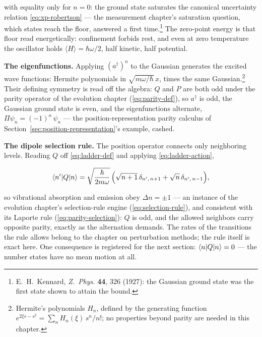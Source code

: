 with equality only for $n = 0$: the ground state saturates the canonical uncertainty relation \eqref{eq:xp-robertson} --- the measurement chapter's saturation question, which states reach the floor, answered a first time.\footnote{E.~H.~Kennard, \emph{Z.~Phys.} \textbf{44}, 326 (1927): the Gaussian ground state was the first state shown to attain the bound.} The zero-point energy is that floor read energetically: confinement forbids rest, and even at zero temperature the oscillator holds $\langle H\rangle = \hbar\omega/2$, half kinetic, half potential.

\textbf{The eigenfunctions.} Applying $(a^\dagger)^n$ to the Gaussian generates the excited wave functions: Hermite polynomials in $\sqrt{m\omega/\hbar}\,x$, times the same Gaussian.\footnote{Hermite's polynomials $H_n$, defined by the generating function $e^{2\xi s - s^2} = \sum_n H_n(\xi)\,s^n/n!$; no properties beyond parity are needed in this chapter.} Their defining symmetry is read off the algebra: $Q$ and $P$ are both odd under the parity operator of the evolution chapter (\eqref{eq:parity-def}), so $a^\dagger$ is odd, the Gaussian ground state is even, and the eigenfunctions alternate, $\Pi\psi_n = (-1)^n\,\psi_n$ --- the position-representation parity calculus of Section~\ref{sec:position-representation}'s example, cashed.

\textbf{The dipole selection rule.} The position operator connects only neighboring levels. Reading $Q$ off \eqref{eq:ladder-def} and applying \eqref{eq:ladder-action},
\begin{linenomath}
    \begin{equation}
        \braket{n'|Q|n} = \sqrt{\frac{\hbar}{2m\omega}}\,\Bigl(\sqrt{n+1}\,\delta_{n',\,n+1} + \sqrt{n}\,\delta_{n',\,n-1}\Bigr),
        \label{eq:oscillator-selection}
    \end{equation}
\end{linenomath}
so vibrational absorption and emission obey $\Delta n = \pm 1$ --- an instance of the evolution chapter's selection-rule engine (\eqref{eq:selection-rule}), and consistent with its Laporte rule (\eqref{eq:parity-selection}): $Q$ is odd, and the allowed neighbors carry opposite parity, exactly as the alternation demands. The rates of the transitions the rule allows belong to the chapter on perturbation methods; the rule itself is exact here. One consequence is registered for the next section: $\braket{n|Q|n} = 0$ --- the number states have no mean motion at all.

